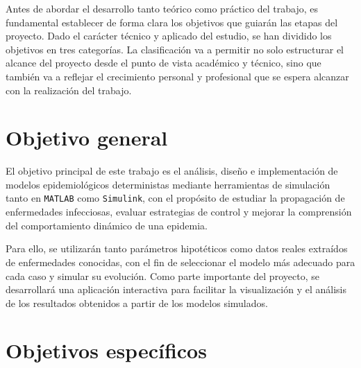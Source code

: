 
Antes de abordar el desarrollo tanto teórico como práctico del trabajo, es fundamental establecer de forma clara los objetivos que guiarán las etapas del proyecto. Dado el carácter técnico y aplicado del estudio, se han dividido los objetivos en tres categorías. La clasificación va a permitir no solo estructurar el alcance del proyecto desde el punto de vista académico y técnico, sino que también va a reflejar el crecimiento personal y profesional que se espera alcanzar con la realización del trabajo.

\section{Objetivo general}

El objetivo principal de este trabajo es el análisis, diseño e implementación de modelos epidemiológicos deterministas mediante herramientas de simulación tanto en \texttt{MATLAB} como \texttt{Simulink}, con el propósito de estudiar la propagación de enfermedades infecciosas, evaluar estrategias de control y mejorar la comprensión del comportamiento dinámico de una epidemia.

Para ello, se utilizarán tanto parámetros hipotéticos como datos reales extraídos de enfermedades conocidas, con el fin de seleccionar el modelo más adecuado para cada caso y simular su evolución. Como parte importante del proyecto, se desarrollará una aplicación interactiva para facilitar la visualización y el análisis de los resultados obtenidos a partir de los modelos simulados.

\section{Objetivos específicos}

